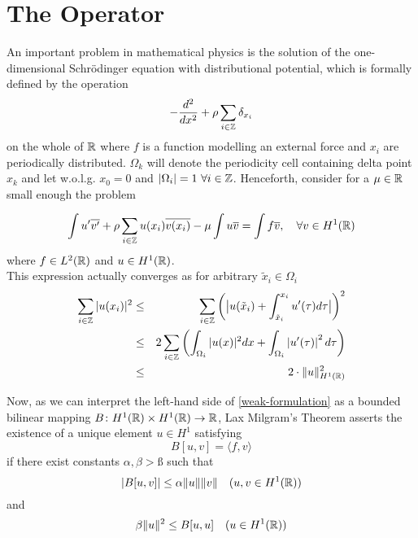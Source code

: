 \chapter{The Operator}


An important problem in mathematical physics is the solution of the one-dimensional Schrödinger equation with distributional potential, which is formally defined by the operation
\begin{equation}
	- \frac{d^{2}}{dx^{2}} + \rho \sum_{i \in \mathbb{Z}} \delta_{x_{i}} \label{the-operator}
\end{equation}
on the whole of $\mathbb{R}$ where $f$ is a function modelling an external force and $x_{i}$ are periodically distributed. $\Omega_{k}$ will denote the periodicity cell containing delta point $x_{k}$ and let w.o.l.g. $x_{0} = 0$ and $|\Omega_{i}| = 1 ~\forall i \in \mathbb{Z}$.  Henceforth, consider	for a $\mu \in \mathbb{R}$ small enough the problem 
	
\begin{equation}
	\int u' \overline{v'} + \rho \sum_{i \in \mathbb{Z}} u(x_{i}) \overline{v(x_{i})} - \mu \int u \overline{v} = \int f \overline{v}, \quad \forall v \in H^{1}(\mathbb{R}) \label{weak-formulation}
\end{equation}	
where $f \in L^{2}(\mathbb{R})$ and $u \in H^{1}(\mathbb{R})$. \\
	
This expression actually converges as for arbitrary $\tilde{x}_{i} \in \Omega_{i}$
\begin{eqnarray}
	\sum_{i \in \mathbb{Z}} |u(x_{i})|^{2} & \leq & \sum_{i \in \mathbb{Z}} \left( \big| u(\tilde{x}_{i}) + \int_{\tilde{x}_{i}}^{x_{i}} u'( \tau ) d\tau \big| \right)^{2} \notag \\
		 & \leq & 2 \sum_{i \in \mathbb{Z}} \left( \int_{\Omega_{i}} |u( x )|^{2} dx +  \int_{\Omega_{i}} \left| u'(\tau) \right|^{2} d\tau \right) \notag \\
		 & \leq & 2 \cdot \| u \|^{2}_{H^{1}(\mathbb{R})} \label{eq:potentialestim}
\end{eqnarray}

Now, as we can interpret the left-hand side of \eqref{weak-formulation} as a bounded bilinear mapping $B \colon H^{1}(\mathbb{R}) \times H^{1}(\mathbb{R}) \rightarrow \mathbb{R}$, Lax Milgram's Theorem asserts the existence of a unique element $u \in H^{1}$ satisfying
\begin{equation*}
	B[u, v] = \langle f, v \rangle
\end{equation*}
if there exist constants $\alpha, \beta > ß$ such that
	\[ \left| B[u,v] \right| \leq \alpha \|u\| \|v\| \quad (u, v \in H^{1}(\mathbb{R})) \]
and
	\[ \beta \|u\|^{2} \leq B[u, u] \quad (u \in H^{1}(\mathbb{R})) \]

